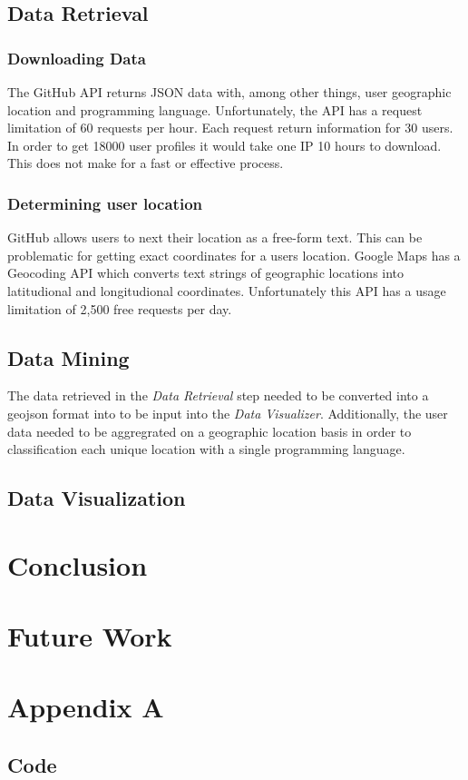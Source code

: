 \documentclass[11pt]{article}
\begin{document}
   \subsection{Data Retrieval}
      \subsubsection{Downloading Data}
The GitHub API returns JSON data with, among other things, user geographic location and programming language. Unfortunately, the API has a request limitation of 60 requests per hour. Each request return information for 30 users. In order to get 18000 user profiles it would take one IP 10 hours to download. This does not make for a fast or effective process.
      \subsubsection{Determining user location}
GitHub allows users to next their location as a free-form text. This can be problematic for getting exact coordinates for a users location. Google Maps has a Geocoding API which converts text strings of geographic locations into latitudional and longitudional coordinates. Unfortunately this API has a usage limitation of 2,500 free requests per day. 
   \subsection{Data Mining}
The data retrieved in the \textit{Data Retrieval} step needed to be converted into a geojson format into to be input into the \textit{Data Visualizer}. Additionally, the user data needed to be aggregrated on a geographic location basis in order to classification each unique location with a single programming language.
   \subsection{Data Visualization}
\section{Conclusion}
\section{Future Work}



\citation
\pagebreak
\onecolumn
\begingroup

%

\section{Appendix A}
\subsection{Code}
\endgroup
\end{document}
